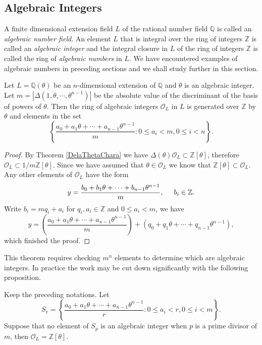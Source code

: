 \subsection{Algebraic Integers}
A finite dimensional extension field $L$ of the rational number field $\mathbb{Q}$ is called an \textit{algebraic number field}. An element $L$ that is integral over the ring of integers $\mathbb{Z}$ is called an \textit{algebraic integer} and the integral closure in $L$ of the ring of integers $\mathbb{Z}$ is called the ring of \textit{algebraic numbers} in $L$. We have encountered examples of algebraic numbers in preceding sections and we shall study further in this section.
\begin{proposition}\label{OLgenerators}
Let $L=\mathbb{Q}(\theta)$ be an $n$-dimensional extension of $\mathbb{Q}$ and $\theta$ is an algebraic integer. Let $m=|\Delta(1,\theta,\cdots,\theta^{n-1})|$ be the absolute value of the discriminant of the basis of powers of $\theta$. Then the ring of algebraic integers $\mathcal{O}_L$ in $L$ is generated over $\mathbb{Z}$ by $\theta$ and elements in the set 
$$
\left\{ \frac{a_0+a_1\theta +\cdots +a_{n-1}\theta ^{n-1}}{m}:0\le a_i<m,0\le i<n \right\} .
$$
\end{proposition}
\begin{proof}
By Theorem \ref{DelaThetaChara} we have $\Delta(\theta)\mathcal{O}_L\subset\mathbb{Z}[\theta]$, therefore $\mathcal{O}_L\subset 1/m\mathbb{Z}[\theta]$. Since we have assumed that $\theta\in\mathcal{O}_L$ we know that $\mathbb{Z}[\theta]\subset\mathcal{O}_L$. Any other elements of $\mathcal{O}_L$ have the form 
$$
y=\frac{b_0+b_1\theta +\cdots +b_{n-1}\theta ^{n-1}}{m},\hspace{0.5cm}b_i\in \mathbb{Z} .
$$
Write $b_i=mq_i+a_i$ for $q_i, a_i\in\mathbb{Z}$ and $0\le a_i<m$, we have 
$$
y=\left( \frac{a_0+a_1\theta +\cdots +a_{n-1}\theta ^{n-1}}{m} \right) +\left( q_0+q_1\theta +\cdots +q_{n-1}\theta ^{n-1} \right) ,
$$
which finished the proof.
\end{proof}
This theorem requires checking $m^n$ elements to determine which are algebraic integers. In practice the work may be cut down significantly with the following proposition.
\begin{proposition}\label{Sp}
Keep the preceding notations. Let 
$$
S_r=\left\{ \frac{a_0+a_1\theta +\cdots +a_{n-1}\theta ^{n-1}}{r}:0\le a_i<r,0\le i<m \right\} .
$$
Suppose that no element of $S_p$ is an algebraic integer when $p$ is a prime divisor of $m$, then $\mathcal{O}_L=\mathbb{Z}[\theta]$.
\end{proposition}
